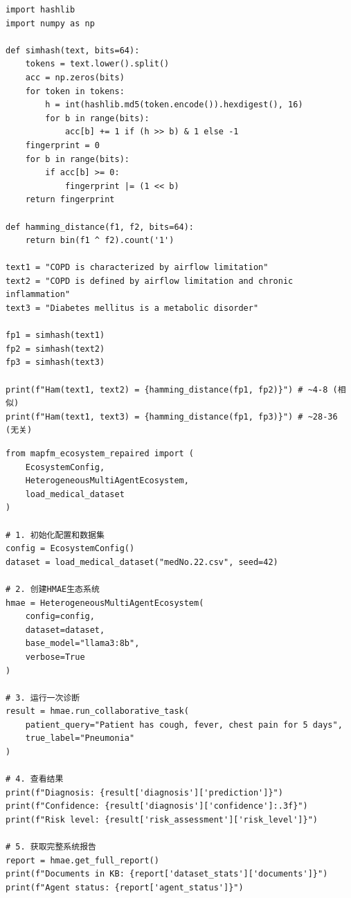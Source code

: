 \documentclass[11pt,a4paper]{ctexart}
\begin{document}
\begin{codebox}[实验5：SimHash去重实验]
\small
\begin{verbatim}
import hashlib
import numpy as np

def simhash(text, bits=64):
    tokens = text.lower().split()
    acc = np.zeros(bits)
    for token in tokens:
        h = int(hashlib.md5(token.encode()).hexdigest(), 16)
        for b in range(bits):
            acc[b] += 1 if (h >> b) & 1 else -1
    fingerprint = 0
    for b in range(bits):
        if acc[b] >= 0:
            fingerprint |= (1 << b)
    return fingerprint

def hamming_distance(f1, f2, bits=64):
    return bin(f1 ^ f2).count('1')

text1 = "COPD is characterized by airflow limitation"
text2 = "COPD is defined by airflow limitation and chronic inflammation"
text3 = "Diabetes mellitus is a metabolic disorder"

fp1 = simhash(text1)
fp2 = simhash(text2)
fp3 = simhash(text3)

print(f"Ham(text1, text2) = {hamming_distance(fp1, fp2)}") # ~4-8 (相似)
print(f"Ham(text1, text3) = {hamming_distance(fp1, fp3)}") # ~28-36 (无关)
\end{verbatim}
\normalsize
\end{codebox}

\begin{codebox}[实验6：HMAE生态系统最小运行示例]
\small
\begin{verbatim}
from mapfm_ecosystem_repaired import (
    EcosystemConfig,
    HeterogeneousMultiAgentEcosystem,
    load_medical_dataset
)

# 1. 初始化配置和数据集
config = EcosystemConfig()
dataset = load_medical_dataset("medNo.22.csv", seed=42)

# 2. 创建HMAE生态系统
hmae = HeterogeneousMultiAgentEcosystem(
    config=config,
    dataset=dataset,
    base_model="llama3:8b",
    verbose=True
)

# 3. 运行一次诊断
result = hmae.run_collaborative_task(
    patient_query="Patient has cough, fever, chest pain for 5 days",
    true_label="Pneumonia"
)

# 4. 查看结果
print(f"Diagnosis: {result['diagnosis']['prediction']}")
print(f"Confidence: {result['diagnosis']['confidence']:.3f}")
print(f"Risk level: {result['risk_assessment']['risk_level']}")

# 5. 获取完整系统报告
report = hmae.get_full_report()
print(f"Documents in KB: {report['dataset_stats']['documents']}")
print(f"Agent status: {report['agent_status']}")
\end{verbatim}
\normalsize
\end{codebox}
\end{document}
